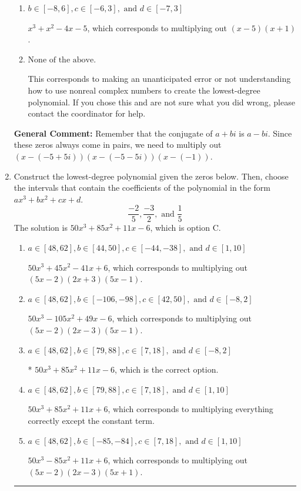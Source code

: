 \documentclass{extbook}[14pt]
\newcommand{\litem}[1]{\item #1

\rule{\textwidth}{0.4pt}}
\begin{document}
\begin{enumerate}
{\begin{enumerate}[label=\Alph*.]
$x^{3} + x^{2} +6 x + 5$, which corresponds to multiplying out $(x + 5)(x + 1)$.
\item \( b \in [-8, 6], c \in [-6, 3], \text{ and } d \in [-7, 3] \)

$x^{3} + x^{2} -4 x -5$, which corresponds to multiplying out $(x -5)(x + 1)$.
\item \( \text{None of the above.} \)

This corresponds to making an unanticipated error or not understanding how to use nonreal complex numbers to create the lowest-degree polynomial. If you chose this and are not sure what you did wrong, please contact the coordinator for help.
\end{enumerate}

\textbf{General Comment:} Remember that the conjugate of $a+bi$ is $a-bi$. Since these zeros always come in pairs, we need to multiply out $(x-(-5 + 5 i))(x-(-5 - 5 i))(x-(-1))$.
}
\litem{
Construct the lowest-degree polynomial given the zeros below. Then, choose the intervals that contain the coefficients of the polynomial in the form $ax^3+bx^2+cx+d$.
\[ \frac{-2}{5}, \frac{-3}{2}, \text{ and } \frac{1}{5} \]The solution is \( 50x^{3} +85 x^{2} +11 x -6 \), which is option C.\begin{enumerate}[label=\Alph*.]
\item \( a \in [48, 62], b \in [44, 50], c \in [-44, -38], \text{ and } d \in [1, 10] \)

$50x^{3} +45 x^{2} -41 x + 6$, which corresponds to multiplying out $(5x -2)(2x + 3)(5x -1)$.
\item \( a \in [48, 62], b \in [-106, -98], c \in [42, 50], \text{ and } d \in [-8, 2] \)

$50x^{3} -105 x^{2} +49 x -6$, which corresponds to multiplying out $(5x -2)(2x -3)(5x -1)$.
\item \( a \in [48, 62], b \in [79, 88], c \in [7, 18], \text{ and } d \in [-8, 2] \)

* $50x^{3} +85 x^{2} +11 x -6$, which is the correct option.
\item \( a \in [48, 62], b \in [79, 88], c \in [7, 18], \text{ and } d \in [1, 10] \)

$50x^{3} +85 x^{2} +11 x + 6$, which corresponds to multiplying everything correctly except the constant term.
\item \( a \in [48, 62], b \in [-85, -84], c \in [7, 18], \text{ and } d \in [1, 10] \)

$50x^{3} -85 x^{2} +11 x + 6$, which corresponds to multiplying out $(5x -2)(2x -3)(5x + 1)$.
\end{enumerate}

}
\end{enumerate}
\end{document}
